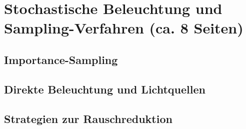 \section{Stochastische Beleuchtung und Sampling-Verfahren (ca. 8 Seiten)}

\subsection{Importance-Sampling}
\subsection{Direkte Beleuchtung und Lichtquellen}
\subsection{Strategien zur Rauschreduktion}